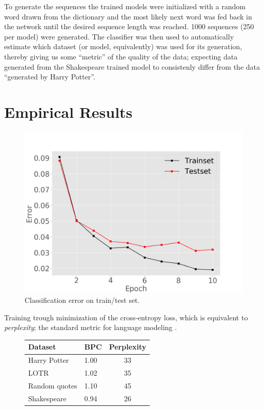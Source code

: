 \documentclass{article}
\begin{document}
To generate the sequences the trained models were initialized with a random word
drawn from the dictionary and the most likely next word was fed back in the network
until the desired sequence length was reached. 1000 sequences (250 per model) were
generated. The classifier was then used to automatically estimate which
dataset (or model, equivalently) was used for its generation, thereby giving us
some ``metric'' of the quality of the data; expecting data generated from the
Shakespeare trained model to consistenly differ from the data ``generated by
Harry Potter''.
\clearpage
\section{Empirical Results}
\begin{figure}[ht]
\vskip 0.2in
\begin{center}
\centerline{\includegraphics[width=\columnwidth]{classerror}}
\caption{Classification error on train/test set.}
\end{center}
\vskip -0.2in
\end{figure} 

Training trough minimization of the cross-entropy loss, which is equivalent to
\textit{perplexity}; the standard metric for language
modeling \cite{gravesGenerating}.
\begin{figure}[htbp!]
\begin{tabular}{|l|l|c|}
\hline
Dataset & BPC & Perplexity \\
\hline
Harry Potter & 1.00 & 33 \\
LOTR & 1.02 & 35 \\
Random quotes & 1.10 & 45 \\
Shakespeare & 0.94 & 26\\
\hline
\end{tabular}
\end{figure}
\end{document}
